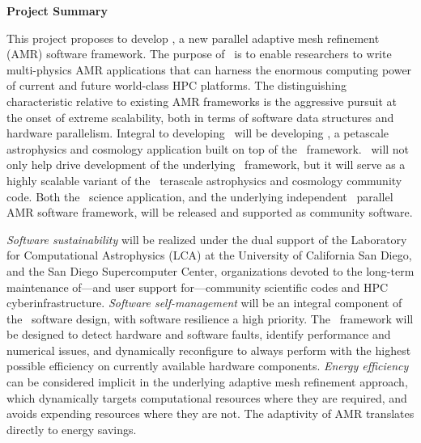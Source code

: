 \documentclass[11pt,letterpaper]{article}
\begin{document}
\noindent
\textbf{Project Summary}

%
%
%
%
This project proposes to develop \cello, a new parallel adaptive mesh
refinement (AMR) software framework.  The purpose of \cello\ is to
enable researchers to write multi-physics AMR applications that can
harness the enormous computing power of current and future world-class
HPC platforms.  The distinguishing characteristic relative to existing
AMR frameworks is the aggressive pursuit at the onset of extreme
scalability, both in terms of software data structures and hardware
parallelism.
%
Integral to developing \cello\ will be developing \enzoii, a petascale
astrophysics and cosmology application built on top of the \cello\
framework.  \enzoii\ will not only help drive development of the
underlying \cello\ framework, but it will serve as a highly scalable
variant of the \enzo\ terascale astrophysics and cosmology community
code.  Both the \enzoii\ science application, and the underlying
independent \cello\ parallel AMR software framework, will be released
and supported as community software.

\textit{Software sustainability} will be realized under the dual
support of the Laboratory for Computational Astrophysics (LCA) at the
University of California San Diego, and the San Diego Supercomputer
Center, organizations devoted to the long-term maintenance of---and
user support for---community scientific codes and HPC cyberinfrastructure.
%
\textit{Software self-management} will be an integral component of the
\cello\ software design, with software resilience a high priority.
The \cello\ framework will be designed to detect hardware and software
faults, identify performance and numerical issues, and dynamically
reconfigure to always perform with the highest possible efficiency on
currently available hardware components.
%
\textit{Energy efficiency} can be considered implicit in the
underlying adaptive mesh refinement approach, which dynamically
targets computational resources where they are required, and avoids
expending resources where they are not.  The adaptivity of AMR
translates directly to energy savings.

\end{document}
